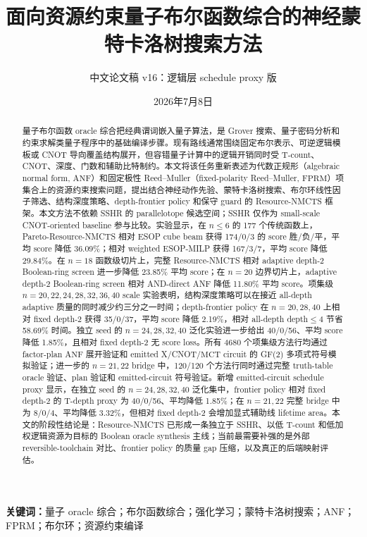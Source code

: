 \documentclass[UTF8,fontset=macnew,11pt]{ctexart}
\title{面向资源约束量子布尔函数综合的神经蒙特卡洛树搜索方法}
\author{中文论文稿 v16：逻辑层 schedule proxy 版}
\date{2026年7月8日}
\newcommand{\method}{Resource-NMCTS}
\newcommand{\screen}{Boolean-ring screen}
\newcommand{\anf}{\ensuremath{\mathrm{ANF}}}
\newcommand{\fprm}{\ensuremath{\mathrm{FPRM}}}
\newcommand{\ttable}{truth-table}
\newcommand{\mct}{\ensuremath{\mathrm{MCT}}}
\begin{document}
\pagestyle{plain}
\maketitle

\begin{abstract}
量子布尔函数 oracle 综合把经典谓词嵌入量子算法，是 Grover 搜索、量子密码分析和约束求解类量子程序中的基础编译步骤。现有路线通常围绕固定布尔表示、可逆逻辑模板或 CNOT 导向覆盖结构展开，但容错量子计算中的逻辑开销同时受 T-count、CNOT、深度、门数和辅助比特制约。本文将该任务重新表述为代数正规形（algebraic normal form, \anf{}）和固定极性 Reed--Muller（fixed-polarity Reed--Muller, \fprm{}）项集合上的资源约束搜索问题，提出结合神经动作先验、蒙特卡洛树搜索、布尔环线性因子筛选、结构深度策略、depth-frontier policy 和保守 guard 的 \method{} 框架。本文方法不依赖 SSHR 的 parallelotope 候选空间；SSHR 仅作为 small-scale CNOT-oriented baseline 参与比较。实验显示，在 $n\leq6$ 的 177 个传统函数上，Pareto-\method{} 相对 ESOP cube beam 获得 174/0/3 的 score 胜/负/平，平均 score 降低 36.09\%；相对 weighted ESOP-MILP 获得 167/3/7，平均 score 降低 29.84\%。在 $n=18$ 函数级切片上，完整 \method{} 相对 adaptive depth-2 \screen{} 进一步降低 23.85\% 平均 score；在 $n=20$ 边界切片上，adaptive depth-2 \screen{} 相对 AND-direct ANF 降低 11.80\% 平均 score。项集级 $n=20,22,24,28,32,36,40$ scale 实验表明，结构深度策略可以在接近 all-depth adaptive 质量的同时减少约三分之一时间；depth-frontier policy 在 $n=20,28,40$ 上相对 fixed depth-2 获得 35/0/37，平均 score 降低 2.19\%，相对 all-depth depth$\leq4$ 节省 58.69\% 时间。独立 seed 的 $n=24,28,32,40$ 泛化实验进一步给出 40/0/56、平均 score 降低 1.85\%，且相对 fixed depth-2 无 score loss。所有 4680 个项集级方法行均通过 factor-plan \anf{} 展开验证和 emitted X/CNOT/\mct{} circuit 的 GF(2) 多项式符号模拟验证；进一步的 $n=21,22$ bridge 中，120/120 个方法行同时通过完整 \ttable{} oracle 验证、plan 验证和 emitted-circuit 符号验证。新增 emitted-circuit schedule proxy 显示，在独立 seed 的 $n=24,28,32,40$ 泛化集中，frontier policy 相对 fixed depth-2 的 T-depth proxy 为 40/0/56、平均降低 1.85\%；在 $n=21,22$ 完整 bridge 中为 8/0/4、平均降低 3.32\%，但相对 fixed depth-2 会增加显式辅助线 lifetime area。本文的阶段性结论是：\method{} 已形成一条独立于 SSHR、以低 T-count 和低加权逻辑资源为目标的 Boolean oracle synthesis 主线；当前最需要补强的是外部 reversible-toolchain 对比、frontier policy 的质量 gap 压缩，以及真正的后端映射评估。
\end{abstract}

\noindent\textbf{关键词：}量子 oracle 综合；布尔函数综合；强化学习；蒙特卡洛树搜索；ANF；FPRM；布尔环；资源约束编译
\end{document}
